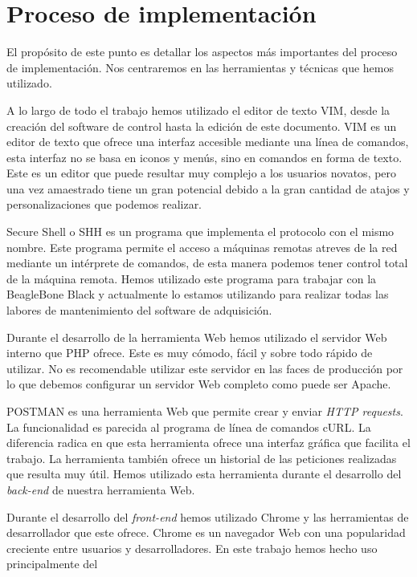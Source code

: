 \chapter{Proceso de implementación}
	El propósito de este punto es detallar los aspectos más importantes del proceso de implementación. Nos centraremos en las herramientas y
	técnicas que hemos utilizado.
	\par
	A lo largo de todo el trabajo hemos utilizado el editor de texto VIM\cite{vim}, desde la creación del software de control hasta la edición de
	este documento. VIM es un editor de texto que ofrece una interfaz accesible mediante una línea de comandos, esta interfaz no se basa en iconos
	y menús, sino en comandos en forma de texto. Este es un editor que puede resultar muy complejo a los usuarios novatos, pero una vez amaestrado
	tiene un gran potencial debido a la gran cantidad de atajos y personalizaciones que podemos realizar.
	\par
	Secure Shell o SHH\cite{ssh} es un programa que implementa el protocolo con el mismo nombre. Este programa permite el acceso a máquinas
	remotas atreves de  la red mediante un intérprete de comandos, de esta manera podemos tener control total de la máquina remota. Hemos
	utilizado este programa para trabajar con la BeagleBone Black y actualmente lo estamos utilizando para realizar todas  las labores de
	mantenimiento del software de adquisición.
	\par
	Durante el desarrollo de la herramienta Web hemos utilizado el servidor Web interno que PHP ofrece. Este es muy cómodo, fácil y sobre todo
	rápido de utilizar. No es recomendable utilizar este servidor en las faces de producción por lo que debemos configurar un servidor Web
	completo como puede ser Apache\cite{Apache}.
	\par
	POSTMAN\cite{Postman} es una herramienta Web que permite crear y enviar \emph{HTTP requests}. La  funcionalidad es parecida al programa de
	línea de comandos cURL. La diferencia radica en que esta herramienta ofrece una interfaz gráfica que facilita el trabajo. La herramienta
	también ofrece un historial de las peticiones realizadas que resulta muy útil. Hemos utilizado esta herramienta durante el desarrollo del
	\emph{back-end} de nuestra herramienta Web.
	\par
	Durante el desarrollo del \emph{front-end} hemos utilizado Chrome y las herramientas de desarrollador que este ofrece\cite{ChromeDev}. Chrome
	es un navegador Web con una popularidad creciente entre usuarios y desarrolladores. En este trabajo hemos hecho uso principalmente del
